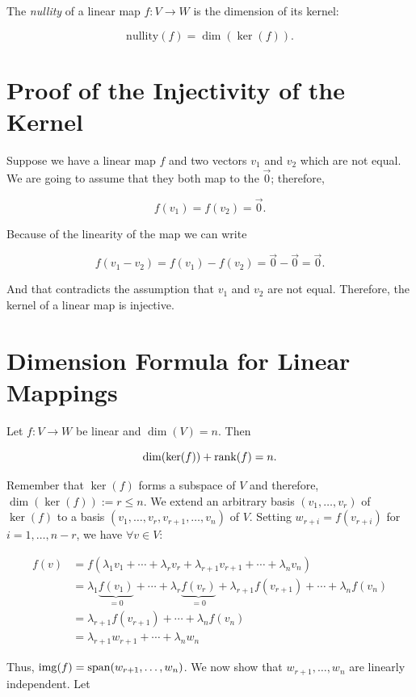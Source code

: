 The \emph{nullity} of a linear map \( f: V \to W \) is the dimension of its kernel:
    
\[
    \mathrm{nullity}(f) = \dim(\ker(f)).
\]

\section{Proof of the Injectivity of the Kernel}

Suppose we have a linear map \(f\) and two vectors \(v_1\) and \(v_2\) which are not equal. 
We are going to assume that they both map to the \(\vec{0}\); therefore,

\[
    f(v_1) = f(v_2) = \vec{0}.
\]

Because of the linearity of the map we can write

\[
    f(v_1 - v_2) = f(v_1) - f(v_2) = \vec{0} - \vec{0} = \vec{0}.
\]

And that contradicts the assumption that \(v_1\) and \(v_2\) are not equal. Therefore, the 
kernel of a linear map is injective.

\section{Dimension Formula for Linear Mappings}

Let \(f: V \to W\) be linear and \(\dim(V) = n\). Then
    
\[
    \dim(\ker(f)) + \mathrm{rank}(f) = n.
\]
    
Remember that \(\ker(f)\) forms a subspace of \(V\) and therefore, \(\dim(\ker(f)) := r \leq n\). We extend an arbitrary basis \((v_1, \ldots, v_r)\) of 
\(\ker(f)\) to a basis \((v_1, \ldots, v_r, v_{r+1}, \ldots, v_n)\) of \(V\). Setting \(w_{r+i} = f(v_{r+i})\) for \(i = 1, \ldots, n - r\), we have 
\(\forall v \in V\):

\begin{align*}
    f(v) &= f(\lambda_1v_1 + \cdots + \lambda_r v_r + \lambda_{r+1}v_{r+1} + \cdots + \lambda_n v_n) \\
    &= \lambda_1 \underbrace{f(v_1)}_{=0} + \cdots + \lambda_r \underbrace{f(v_r)}_{=0} + \lambda_{r+1} f(v_{r+1}) + \cdots + \lambda_n f(v_n) \\
    &= \lambda_{r+1} f(v_{r+1}) + \cdots + \lambda_n f(v_n) \\
    &= \lambda_{r+1}w_{r+1} + \cdots + \lambda_n w_n
\end{align*}
    
Thus, \(\mathrm{img}(f) = \operatorname{span}(w_{r+1}, \ldots, w_n)\). We now show that \(w_{r+1}, \ldots, w_n\) are linearly independent. Let 
    
